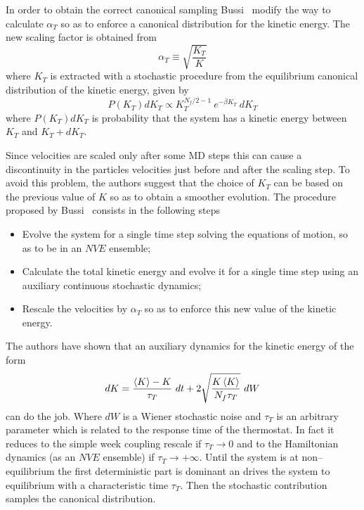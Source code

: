 In order to obtain the correct canonical sampling Bussi \etal\, \cite{Bussi} modify the way to calculate 
$\alpha_T$ so as to enforce a canonical distribution for the kinetic energy. The new scaling factor is obtained 
from
\begin{equation*}
	\alpha_{T} \equiv \sqrt{\frac{K_T}{K}}
\end{equation*}
where $K_T$ is extracted with a stochastic procedure from the equilibrium canonical distribution of the kinetic 
energy, given by
\begin{equation*}
	P(K_T)dK_T \propto K_T^{N_f/2-1}\ e^{-\beta K_T}\ dK_T
\end{equation*}
where $P(K_T)dK_T$ is probability that the system has a kinetic energy between $K_T$ and $K_T + dK_T$.

Since velocities are scaled only after some \ac{MD} steps this can cause a discontinuity in the particles 
velocities just before and after the scaling step. To avoid this problem, the authors suggest that the choice of 
$K_T$ can be based on the previous value of $K$ so as to obtain a smoother evolution. The procedure proposed by 
Bussi \etal\, consists in the following steps
\begin{itemize}
	\item Evolve the system for a single time step solving the equations of motion, so as to be in an $NVE$ ensemble;
	\item Calculate the total kinetic energy and evolve it for a single time step using an auxiliary continuous stochastic dynamics;
	\item Rescale the velocities by $\alpha_T$ so as to enforce this new value of the kinetic energy.
\end{itemize}

The authors have shown that an auxiliary dynamics for the kinetic energy of the form
\begin{equation*}
	dK = \frac{\left \langle K \right \rangle - K}{\tau_T}\ dt + 2 \sqrt{\frac{K\left \langle K \right \rangle}{N_f\tau_T}}\ dW
\end{equation*}
can do the job. Where $dW$ is a Wiener stochastic noise and $\tau_T$ is an arbitrary parameter which is related 
to the response time of the thermostat. In fact it reduces to the simple week coupling rescale if 
$\tau_T\rightarrow 0$ and to the Hamiltonian dynamics (as an $NVE$ ensemble) if $\tau_T\rightarrow +\infty$. 
Until the system is at non--equilibrium the first deterministic part is dominant an drives the system to 
equilibrium with a characteristic time $\tau_T$. Then the stochastic contribution samples the canonical 
distribution.
 

